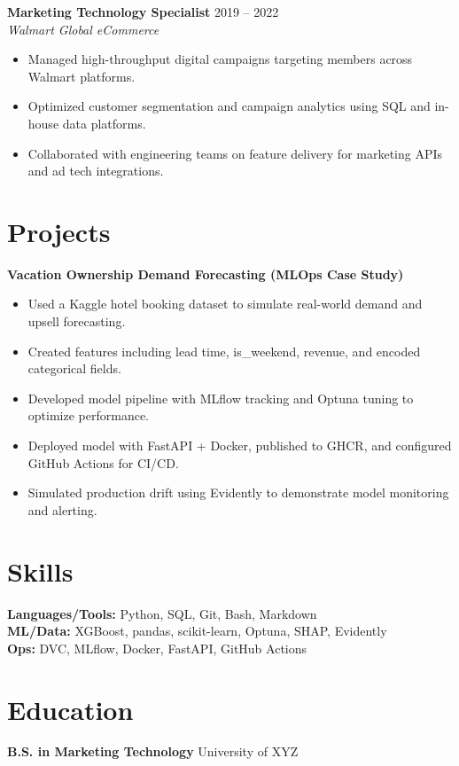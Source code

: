 \documentclass[a4paper,10pt]{article}
\begin{document}
\textbf{Marketing Technology Specialist} \hfill 2019 -- 2022 \\
\textit{Walmart Global eCommerce} \\
\begin{itemize}[leftmargin=*]
    \item Managed high-throughput digital campaigns targeting members across Walmart platforms.
    \item Optimized customer segmentation and campaign analytics using SQL and in-house data platforms.
    \item Collaborated with engineering teams on feature delivery for marketing APIs and ad tech integrations.
\end{itemize}

\section*{Projects}

\textbf{Vacation Ownership Demand Forecasting (MLOps Case Study)} \\
\begin{itemize}[leftmargin=*]
    \item Used a Kaggle hotel booking dataset to simulate real-world demand and upsell forecasting.
    \item Created features including lead time, is\_weekend, revenue, and encoded categorical fields.
    \item Developed model pipeline with MLflow tracking and Optuna tuning to optimize performance.
    \item Deployed model with FastAPI + Docker, published to GHCR, and configured GitHub Actions for CI/CD.
    \item Simulated production drift using Evidently to demonstrate model monitoring and alerting.
\end{itemize}

\section*{Skills}

\textbf{Languages/Tools:} Python, SQL, Git, Bash, Markdown \\
\textbf{ML/Data:} XGBoost, pandas, scikit-learn, Optuna, SHAP, Evidently \\
\textbf{Ops:} DVC, MLflow, Docker, FastAPI, GitHub Actions

\section*{Education}

\textbf{B.S. in Marketing Technology} \hfill University of XYZ
\end{document}
